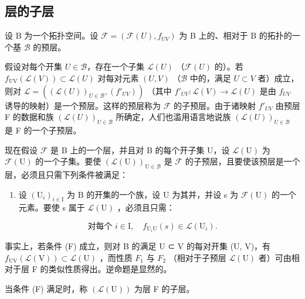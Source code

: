 \subsection{层的子层}

设 B 为一个拓扑空间。设 \(\mathcal{F} = (\mathcal{F}(U), f_{UV})\) 为 B 上的、相对于 B 的拓扑的一个基 \(\mathcal{B}\) 的预层。

假设对每个开集 \(U \in \mathcal{B}\)，存在一个子集 \(\mathcal{L}(U)\) （\(\mathcal{F}(U)\) 的）。若 \(f_{\mathrm{UV}}(\mathcal{L}(V)) \subset \mathcal{L}(U)\) 对每对元素 \((U, V)\) （\(\mathcal{B}\) 中的，满足 \(U \subset V\) 者）成立，则对 \(\mathcal{L} = ((\mathcal{L}(U))_{U \in \mathcal{B}}, (f'_{UV}))\) （其中 \(f'_{UV} \colon \mathcal{L}(V) \to \mathcal{L}(U)\) 是由 \(f_{UV}\) 诱导的映射）是一个预层。这样的预层称为 \(\mathcal{F}\) 的子预层。由于诸映射 \(f'_{UV}\) 由预层 F 的数据和族 \((\mathcal{L}(U))_{U \in \mathcal{B}}\) 所确定，人们也滥用语言地说族 \((\mathcal{L}(U))_{U \in \mathcal{B}}\) 是 F 的一个子预层。

现在假设 \(\mathcal{F}\) 是 B 上的一个层，并且对 B 的每个开子集 U，设 \(\mathcal{L}(\mathrm{U})\) 为 \(\mathcal{F}(\mathrm{U})\) 的一个子集。要使 \((\mathcal{L}(\mathrm{U}))_{\mathrm{U}\in \mathcal{B}}\) 是 \(\mathcal{F}\) 的子预层，且要使该预层是一个层，必须且只需下列条件被满足：

\begin{enumerate}
\def\labelenumi{(\Alph{enumi})}
\setcounter{enumi}{5}
\tightlist
\item
  设 \((\mathrm{U}_{i})_{i\in\mathrm{I}}\) 为 B 的开集的一个族，设 U 为其并，并设 s 为 \(\mathcal{F}(\mathrm{U})\) 的一个元素。要使 s 属于 \(\mathcal{L}(\mathrm{U})\) ，必须且只需：
\end{enumerate}

\[
\text{对每个 } i \in \mathrm{I},\quad f_{\mathrm{U}_{i}\mathrm{U}}(s)\in\mathcal{L}(\mathrm{U}_{i}).
\]

事实上，若条件 (F) 成立，则对 B 的满足 U ⊂ V 的每对开集 (U, V)，有 \(f_{\mathrm{UV}}(\mathcal{L}(\mathrm{V})) \subset \mathcal{L}(\mathrm{U})\) ，而性质 \(F_{1}\) 与 \(F_{2}\) （相对于子预层 \(\mathcal{L}(\mathrm{U})\) 者）可由相对于层 F 的类似性质得出。逆命题是显然的。

当条件 (F) 满足时，称 \((\mathcal{L}(\mathrm{U}))\) 为层 F 的子层。


